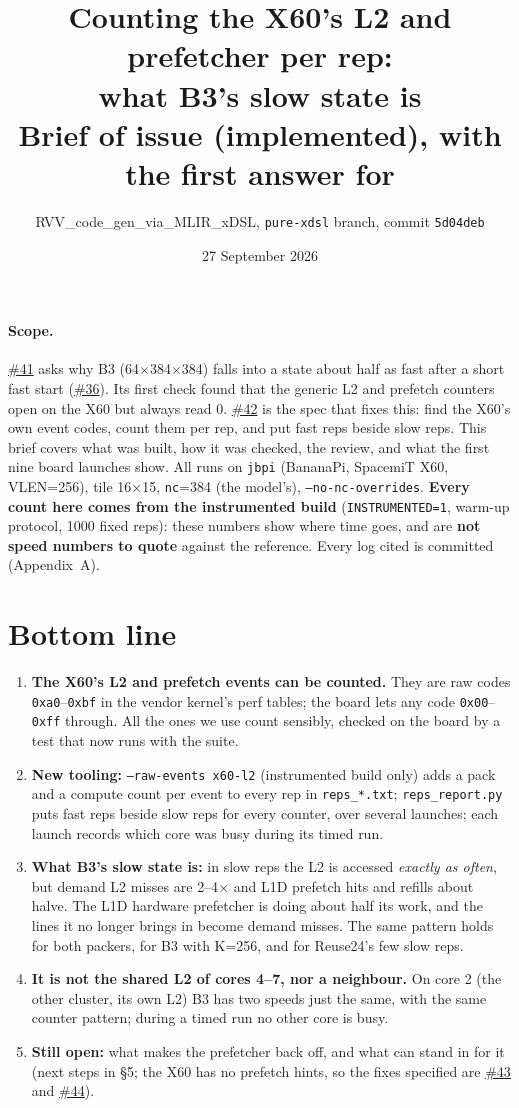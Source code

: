 \documentclass[10pt,a4paper]{article}
\title{\vspace{-1.2cm}\textbf{Counting the X60's L2 and prefetcher per rep:\\ what B3's slow state is}\\[2pt]
\large Brief of issue \iss{42} (implemented), with the first answer for \iss{41}}
\author{RVV\_code\_gen\_via\_MLIR\_xDSL, \texttt{pure-xdsl} branch, commit \texttt{5d04deb}}
\date{27 September 2026}
\newcommand{\iss}[1]{\href{https://github.com/JieGH/RVV_code_gen_via_MLIR_xDSL/issues/#1}{\##1}}
\newcommand{\up}[1]{\textcolor{red!70!black}{#1}}
\newcommand{\down}[1]{\textcolor{blue!60!black}{#1}}
\begin{document}
\maketitle
\vspace{-0.8cm}

\paragraph{Scope.} \iss{41} asks why B3 (64$\times$384$\times$384) falls into a state about half as fast after a
short fast start (\iss{36}). Its first check found that the generic L2 and prefetch counters open on the X60 but
always read 0. \iss{42} is the spec that fixes this: find the X60's own event codes, count them per rep, and put
fast reps beside slow reps. This brief covers what was built, how it was checked, the review, and what the first
nine board launches show. All runs on \texttt{jbpi} (BananaPi, SpacemiT X60, VLEN=256), tile 16$\times$15,
\texttt{nc}=384 (the model's), \texttt{--no-nc-overrides}. \textbf{Every count here comes from the instrumented build}
(\texttt{INSTRUMENTED=1}, warm-up protocol, 1000 fixed reps): these numbers show where time goes, and are
\textbf{not speed numbers to quote} against the reference. Every log cited is committed (Appendix~A).

\section{Bottom line}
\begin{enumerate}
  \item \textbf{The X60's L2 and prefetch events can be counted.} They are raw codes \texttt{0xa0}--\texttt{0xbf} in
  the vendor kernel's perf tables; the board lets any code \texttt{0x00}--\texttt{0xff} through. All the ones we use
  count sensibly, checked on the board by a test that now runs with the suite.
  \item \textbf{New tooling:} \texttt{--raw-events x60-l2} (instrumented build only) adds a pack and a compute count
  per event to every rep in \texttt{reps\_*.txt}; \texttt{reps\_report.py} puts fast reps beside slow reps for every
  counter, over several launches; each launch records which core was busy during its timed run.
  \item \textbf{What B3's slow state is:} in slow reps the L2 is accessed \emph{exactly as often}, but demand L2
  misses are \up{2--4$\times$} and L1D prefetch hits and refills \down{about halve}. The L1D hardware prefetcher is
  doing about half its work, and the lines it no longer brings in become demand misses. The same pattern holds for
  both packers, for B3 with K=256, and for Reuse24's few slow reps.
  \item \textbf{It is not the shared L2 of cores 4--7, nor a neighbour.} On core 2 (the other cluster, its own L2) B3
  has two speeds just the same, with the same counter pattern; during a timed run no other core is busy.
  \item \textbf{Still open:} what makes the prefetcher back off, and what can stand in for it (next steps in
  \S5; the X60 has no prefetch hints, so the fixes specified are \iss{43} and \iss{44}).
\end{enumerate}
\end{document}
